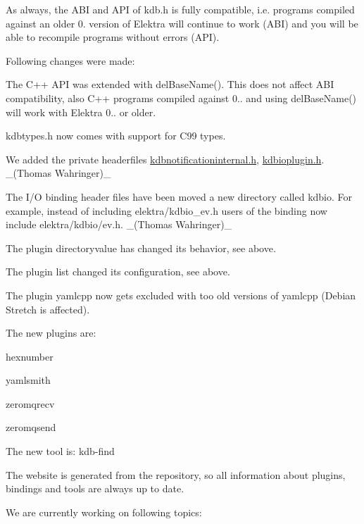 As always, the A\+BI and A\+PI of kdb.\+h is fully compatible, i.\+e. programs compiled against an older 0. version of Elektra will continue to work (A\+BI) and you will be able to recompile programs without errors (A\+PI).

Following changes were made\+:


\begin{DoxyItemize}
\item The C++ A\+PI was extended with {\ttfamily del\+Base\+Name()}. This does not affect A\+BI compatibility, also C++ programs compiled against 0.. and using {\ttfamily del\+Base\+Name()} will work with Elektra 0.. or older.
\item {\ttfamily kdbtypes.\+h} now comes with support for C99 types.
\item We added the private headerfiles {\ttfamily \mbox{\hyperlink{kdbnotificationinternal_8h}{kdbnotificationinternal.\+h}}}, {\ttfamily \mbox{\hyperlink{kdbioplugin_8h}{kdbioplugin.\+h}}}. \+\_\+(\+Thomas Wahringer)\+\_\+
\item The I/O binding header files have been moved a new directory called {\ttfamily kdbio}. For example, instead of including {\ttfamily elektra/kdbio\+\_\+ev.\+h} users of the binding now include {\ttfamily elektra/kdbio/ev.\+h}. \+\_\+(\+Thomas Wahringer)\+\_\+
\item The plugin directoryvalue has changed its behavior, see above.
\item The plugin list changed its configuration, see above.
\item The plugin yamlcpp now gets excluded with too old versions of yamlcpp (Debian Stretch is affected).
\end{DoxyItemize}

The new plugins are\+:


\begin{DoxyItemize}
\item hexnumber
\item yamlsmith
\item zeromqrecv
\item zeromqsend
\end{DoxyItemize}

The new tool is\+: kdb-\/find

The website is generated from the repository, so all information about plugins, bindings and tools are always up to date.

We are currently working on following topics\+:


